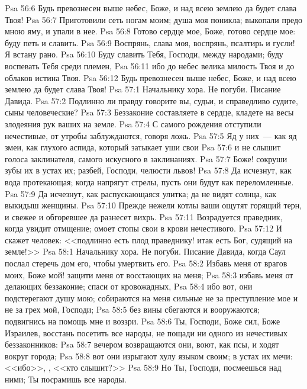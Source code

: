 \vs Psa 56:6 Будь превознесен выше небес, Боже, и над всею землею да будет слава Твоя!
\vs Psa 56:7 Приготовили сеть ногам моим; душа моя поникла; выкопали предо мною яму, и  упали в нее.
\vs Psa 56:8 Готово сердце мое, Боже, готово сердце мое: буду петь и славить.
\vs Psa 56:9 Воспрянь, слава моя, воспрянь, псалтирь и гусли! Я встану рано.
\vs Psa 56:10 Буду славить Тебя, Господи, между народами; буду воспевать Тебя среди племен,
\vs Psa 56:11 ибо до небес велика милость Твоя и до облаков истина Твоя.
\vs Psa 56:12 Будь превознесен выше небес, Боже, и над всею землею да будет слава Твоя!
\vs Psa 57:1 Начальнику хора. Не погуби. Писание Давида.
\rsbpar\vs Psa 57:2 Подлинно ли правду говорите вы, судьи, и справедливо судите, сыны человеческие?
\vs Psa 57:3 Беззаконие составляете в сердце, кладете на весы злодеяния рук ваших на земле.
\vs Psa 57:4 С самого рождения отступили нечестивые, от утробы  заблуждаются, говоря ложь.
\vs Psa 57:5 Яд у них~--- как яд змеи, как глухого аспида, который затыкает уши свои
\vs Psa 57:6 и не слышит голоса заклинателя, самого искусного в заклинаниях.
\vs Psa 57:7 Боже! сокруши зубы их в устах их; разбей, Господи, челюсти львов!
\vs Psa 57:8 Да исчезнут, как вода протекающая; когда напрягут стрелы, пусть они будут как переломленные.
\vs Psa 57:9 Да исчезнут, как распускающаяся улитка; да не видят солнца, как выкидыш женщины.
\vs Psa 57:10 Прежде нежели котлы ваши ощутят горящий терн, и свежее и обгоревшее да разнесет вихрь.
\vs Psa 57:11 Возрадуется праведник, когда увидит отмщение; омоет стопы свои в крови нечестивого.
\vs Psa 57:12 И скажет человек: <<подлинно есть плод праведнику! итак есть Бог, судящий на земле!>>
\vs Psa 58:1 Начальнику хора. Не погуби. Писание Давида, когда Саул послал стеречь дом его, чтобы умертвить его.
\rsbpar\vs Psa 58:2 Избавь меня от врагов моих, Боже мой! защити меня от восстающих на меня;
\vs Psa 58:3 избавь меня от делающих беззаконие; спаси от кровожадных,
\vs Psa 58:4 ибо вот, они подстерегают душу мою; собираются на меня сильные не за преступление мое и не за грех мой, Господи;
\vs Psa 58:5 без вины  сбегаются и вооружаются; подвигнись на помощь мне и воззри.
\vs Psa 58:6 Ты, Господи, Боже сил, Боже Израилев, восстань посетить все народы, не пощади ни одного из нечестивых беззаконников:
\vs Psa 58:7 вечером возвращаются они, воют, как псы, и ходят вокруг города;
\vs Psa 58:8 вот они изрыгают хулу языком своим; в устах их мечи: <<ибо>>, , <<кто слышит?>>
\vs Psa 58:9 Но Ты, Господи, посмеешься над ними; Ты посрамишь все народы.
